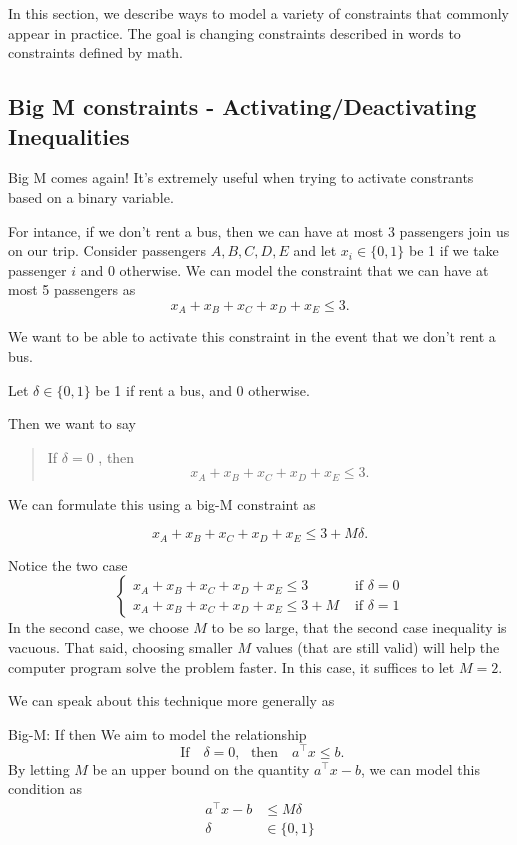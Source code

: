 In this section, we describe ways to model a variety of constraints that commonly appear in practice.  The goal is changing constraints described in words to constraints defined by math.
\subsection{Big M constraints - Activating/Deactivating Inequalities}
Big M comes again!   It's extremely useful when trying to activate constrants based on a binary variable.

For intance, if we don't rent a bus, then we can have at most 3 passengers join us on our trip.   Consider passengers $A,B,C,D,E$ and let $x_i \in \{0,1\}$ be 1 if we take passenger $i$ and 0 otherwise.
We can model the constraint that we can have at most 5 passengers as 
$$
x_A + x_B + x_C + x_D + x_E \leq 3.
$$

We want to be able to activate this constraint in the event that we don't rent a bus.

Let $\delta \in \{0,1\}$ be 1 if rent a bus, and 0 otherwise.  

Then we want to say
\begin{quote}
If $\delta = 0$ , then 
$$
x_A + x_B + x_C + x_D + x_E \leq 3.
$$
\end{quote}

We can formulate this using a big-M constraint as

\begin{equation}
x_A + x_B + x_C + x_D + x_E \leq 3 + M \delta.
\end{equation}

Notice the two case
$$
\begin{cases}
x_A + x_B + x_C + x_D + x_E \leq 3  & \text{ if } \delta = 0\\
x_A + x_B + x_C + x_D + x_E \leq 3 +M & \text{ if } \delta = 1
\end{cases}
$$
In the second case, we choose $M$ to be so large, that the second case inequality is vacuous.    That said, choosing smaller $M$ values (that are still valid) will help the computer program solve the problem faster.  In this case, it suffices to let $M = 2$.

We can speak about this technique more generally as
\begin{general}{Big-M: If then}{}{}
We aim to model the relationship
\begin{equation}
\text{ If } \ \ \   \delta = 0, \ \ \  \text{then  } \ \ \ a^\top x \leq b.
\end{equation}
By letting $M$ be an upper bound on the quantity $a^\top x - b$, we can model this condition as 
\begin{equation}
\begin{split}
a^\top x - b& \leq M\delta\\
\delta & \in \{0,1\}
\end{split}
\end{equation}
\end{general}


